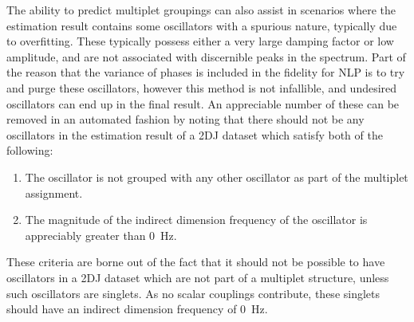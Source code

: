The ability to predict multiplet groupings can also assist in scenarios where the estimation result contains some oscillators with a spurious nature, typically due to overfitting. These typically possess either a very large damping factor or low amplitude, and are not associated with discernible peaks
in the spectrum. Part of the reason that the variance of phases is included in
the fidelity for \ac{NLP} is to try and purge these oscillators,
however this method is not infallible, and undesired oscillators can end up in
the final result. An appreciable number of these can be removed in an automated
fashion by noting that there should not be any oscillators in the estimation
result of a 2DJ dataset which satisfy both of the following:
\begin{enumerate}
    \item The oscillator is not grouped with any other oscillator as part of
        the multiplet assignment.
    \item The magnitude of the indirect dimension frequency of the oscillator
        is appreciably greater than \qty{0}{\hertz}.
\end{enumerate}
These criteria are borne out of the fact that it should not be possible to have
oscillators in a 2DJ dataset which are not part of a multiplet structure,
unless such oscillators are singlets. As no scalar couplings contribute, these
singlets should have an indirect dimension frequency of \qty{0}{\hertz}.

